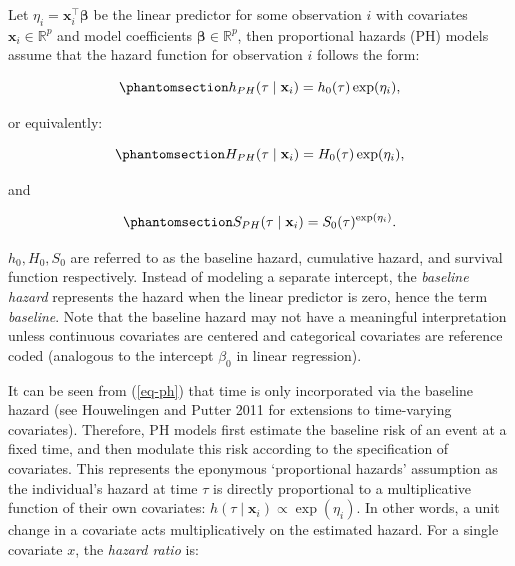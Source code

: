 \documentclass[
  letterpaper,
  krantz2]{style/krantz}
\begin{document}
Let \(\eta_i = \mathbf{x}_i^\top\boldsymbol{\beta}\) be the linear
predictor for some observation \(i\) with covariates
\(\mathbf{x}_i \in \mathbb{R}^p\) and model coefficients
\(\boldsymbol{\beta}\in \mathbb{R}^p\), then proportional hazards (PH)
models assume that the hazard function for observation \(i\) follows the
form:

\begin{equation}\phantomsection\label{eq-ph}{
h_{PH}(\tau \mid \mathbf{x}_i)= h_0(\tau)\exp(\eta_i),
}\end{equation}

or equivalently:

\begin{equation}\phantomsection\label{eq-ph-cum}{
H_{PH}(\tau \mid \mathbf{x}_i)= H_0(\tau)\exp(\eta_i),
}\end{equation}

and

\begin{equation}\phantomsection\label{eq-ph-surv}{
S_{PH}(\tau \mid \mathbf{x}_i)= S_0(\tau)^{\exp(\eta_i)}.
}\end{equation}

\(h_0,H_0,S_0\) are referred to as the baseline hazard, cumulative
hazard, and survival function
respectively.
Instead of modeling a separate intercept, the \emph{baseline hazard}
represents the hazard when the linear predictor is zero, hence the term
\emph{baseline}. Note that the baseline hazard may not have a meaningful
interpretation unless continuous covariates are centered and categorical
covariates are reference coded (analogous to the intercept \(\beta_0\)
in linear regression).

It can be seen from (\ref{eq-ph}) that time is only incorporated via the
baseline hazard (see Houwelingen and Putter 2011 for extensions to
time-varying covariates). Therefore, PH
models first estimate the baseline risk of an event at a fixed time, and
then modulate this risk according to the specification of covariates.
This represents the eponymous `proportional hazards' assumption as the
individual's hazard at time \(\tau\) is directly proportional to a
multiplicative function of their own covariates:
\(h(\tau \mid \mathbf{x}_i) \propto \exp(\eta_i)\).
In other words, a unit change in a covariate acts multiplicatively on
the estimated hazard. For a single covariate \(x\), the \emph{hazard
ratio} is:
\end{document}
